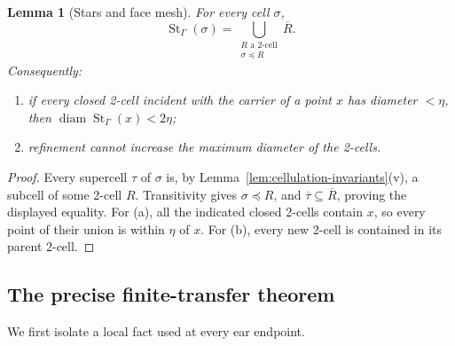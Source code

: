 \documentclass[11pt]{article}
\theoremstyle{mainplain}
\theoremstyle{mainroman}
\newtheorem{longlemma}[theorem]{Lemma}
\theoremstyle{definition}
\newcommand{\alphlabels}{\renewcommand{\labelenumi}{\textup{(\alph{enumi})}}%
  \renewcommand{\theenumi}{\alph{enumi}}}
\numberwithin{equation}{section}
\begin{document}
\begin{longlemma}[Stars and face mesh]\label{lem:star-face-mesh}
For every cell $\sigma$,
\[
 \operatorname{St}_{\Gamma}(\sigma)
 =
 \bigcup_{\substack{R\text{ a 2-cell}\\\sigma\preceq R}}\overline R.
\]
Consequently:
\begin{enumerate}\alphlabels
\item if every closed 2-cell incident with the carrier of a point $x$
      has diameter $<\eta$, then
      $\operatorname{diam}\operatorname{St}_{\Gamma}(x)<2\eta$;
\item refinement cannot increase the maximum diameter of the 2-cells.
\end{enumerate}
\end{longlemma}
\begin{proof}
Every supercell $\tau$ of $\sigma$ is, by
Lemma~\ref{lem:cellulation-invariants}\textup{(v)}, a subcell of some
2-cell $R$. Transitivity gives $\sigma\preceq R$, and
$\overline\tau\subseteq\overline R$, proving the displayed equality.
For (a), all the indicated closed 2-cells contain $x$, so every point
of their union is within $\eta$ of $x$. For (b), every new 2-cell is
contained in its parent 2-cell.
\end{proof}

\subsection{The precise finite-transfer theorem}\label{the-precise-finite-transfer-theorem}

We first isolate a local fact used at every ear endpoint.
\end{document}
